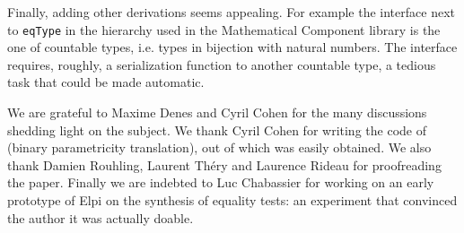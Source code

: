 \documentclass[sigplan,10pt,review]{acmart}\settopmatter{printfolios=true,printccs=false,printacmref=false}
\newcommand{\derive}[1]{\keys{#1}}
\begin{document}
Finally, adding other derivations seems appealing. For example
the interface next to \lstinline+eqType+ in the hierarchy used
in the Mathematical Component library is the one of countable types,
i.e. types in bijection with natural numbers. The interface
requires, roughly, a serialization function to another countable
type, a tedious task that could be made automatic.

\begin{acks}
We are grateful to Maxime Denes and Cyril Cohen for the many discussions
shedding light on the subject. We thank Cyril Cohen for writing the code 
of \derive{param2} (binary parametricity translation), out of which
\derive{param1} was easily obtained.  
We also thank Damien Rouhling, Laurent Th\'ery and Laurence Rideau
for proofreading the paper.
Finally we are indebted
to Luc Chabassier for working on an early prototype of Elpi on
the synthesis of equality tests: an experiment that convinced
the author it was actually doable.
\end{acks}





\end{document}
